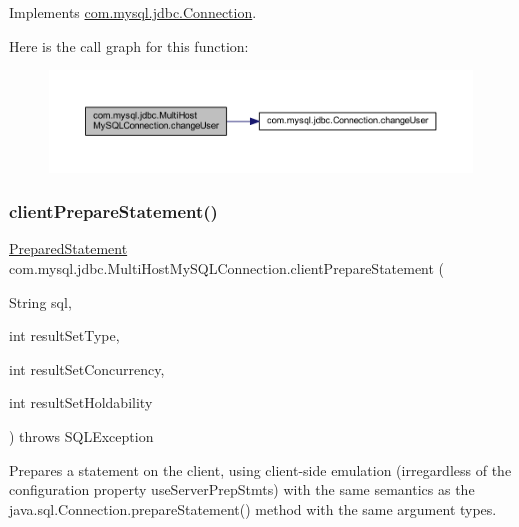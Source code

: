 Implements \mbox{\hyperlink{interfacecom_1_1mysql_1_1jdbc_1_1_connection_a6a6160ecb2c19b5f246450ba9252907d}{com.\+mysql.\+jdbc.\+Connection}}.

Here is the call graph for this function\+:
\nopagebreak
\begin{figure}[H]
\begin{center}
\leavevmode
\includegraphics[width=350pt]{classcom_1_1mysql_1_1jdbc_1_1_multi_host_my_s_q_l_connection_aae20768c54f41ae55ba08171a06b4a11_cgraph}
\end{center}
\end{figure}
\mbox{\label{classcom_1_1mysql_1_1jdbc_1_1_multi_host_my_s_q_l_connection_a5b3d4ce08f970c43ce42d939eae35b38}} 
\subsubsection{\texorpdfstring{client\+Prepare\+Statement()}{clientPrepareStatement()}\hspace{0.1cm}{\footnotesize\ttfamily [1/6]}}
{\footnotesize\ttfamily \mbox{\hyperlink{classcom_1_1mysql_1_1jdbc_1_1_prepared_statement}{Prepared\+Statement}} com.\+mysql.\+jdbc.\+Multi\+Host\+My\+S\+Q\+L\+Connection.\+client\+Prepare\+Statement (\begin{DoxyParamCaption}\item[{String}]{sql,  }\item[{int}]{result\+Set\+Type,  }\item[{int}]{result\+Set\+Concurrency,  }\item[{int}]{result\+Set\+Holdability }\end{DoxyParamCaption}) throws S\+Q\+L\+Exception}

Prepares a statement on the client, using client-\/side emulation (irregardless of the configuration property \textquotesingle{}use\+Server\+Prep\+Stmts\textquotesingle{}) with the same semantics as the java.\+sql.\+Connection.\+prepare\+Statement() method with the same argument types.

